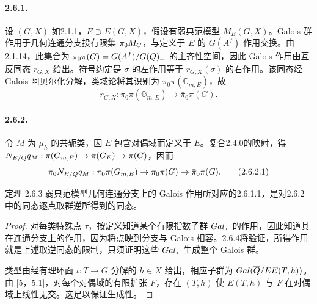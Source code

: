 \paragraph*{2.6.1.} 设 $(G,X)$ 如2.1.1，$E\supset E(G,X)$，假设有弱典范模型 $M_E(G,X)$。Galois 群作用于几何连通分支投有限集 $\pi_0M_{C}$，与定义于 $E$ 的 $G(A^f)$ 作用交换。由2.1.14，此集合为 $\bar\pi_0\pi(G)=G(A^f)/G(Q)_+^-$ 的主齐性空间，因此 Galois 作用由互反同态 $r_{G,X}$ 给出。符号约定是 $\sigma$ 的左作用等于 $r_{G,X}(\sigma)$ 的右作用。该同态经 Galois 阿贝尔化分解，类域论将其识别为 $\pi_0\pi(\mathbb G_{m,E})$，故
\begin{equation}
 r_{G,X}:\pi_0\pi(\mathbb G_{m,E})\to\bar\pi_0\pi(G).
 \tag{2.6.1.1}
\end{equation}
\paragraph*{2.6.2.} 令 $M$ 为 $\mu_h$ 的共轭类，因 $E$ 包含对偶域而定义于 $E$。复合2.4.0的映射，得 $N_{E/Q}q_M:\pi(G_{m,E})\to\pi(G_E)\to\pi(G)$，因而
\begin{equation}
 \pi_0N_{E/Q}q_M:\pi_0\pi(G_{m,E})\to\pi_0\pi(G)\to\bar\pi_0\pi(G).
 \tag{2.6.2.1}
\end{equation}
\begin{originaltheorem}{定理 2.6.3}
弱典范模型几何连通分支上的 Galois 作用所对应的2.6.1.1，是对2.6.2中的同态逐点取群逆所得到的同态。
\end{originaltheorem}
\begin{proof}
对每类特殊点 $\tau$，按定义知道某个有限指数子群 $Gal_\tau$ 的作用，因此知道其在连通分支上的作用，因为将点映到分支与 Galois 相容。2.6.4将验证，所得作用就是上述取逆同态的限制，只须证明这些 $Gal_\tau$ 生成整个 Galois 群。

类型由经有理环面 $\iota:T\to G$ 分解的 $h\in X$ 给出，相应子群为 $Gal(\overline{Q}/EE(T,h))$。由 [5，5.1]，对每个对偶域的有限扩张 $F$，存在 $(T,h)$ 使 $E(T,h)$ 与 $F$ 在对偶域上线性无交。这足以保证生成性。
\end{proof}
